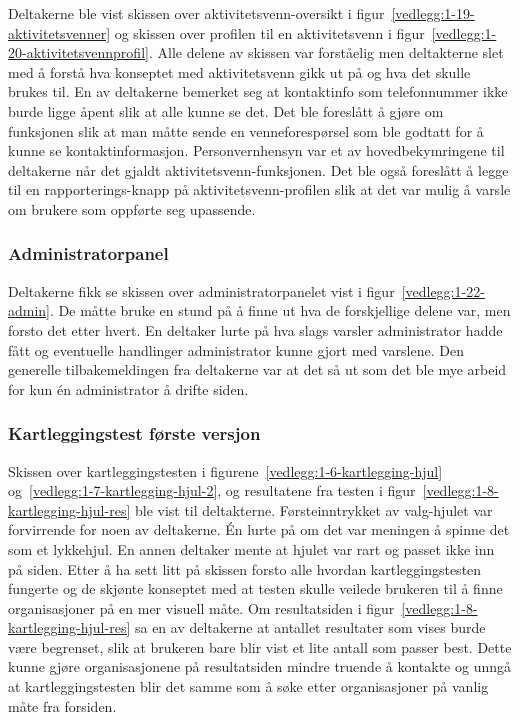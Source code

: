 Deltakerne ble vist skissen over aktivitetsvenn-oversikt i figur~\ref{vedlegg:1-19-aktivitetsvenner} og skissen over profilen til en aktivitetsvenn i figur~\ref{vedlegg:1-20-aktivitetsvennprofil}. Alle delene av skissen var forståelig men deltakterne slet med å forstå hva konseptet med aktivitetsvenn gikk ut på og hva det skulle brukes til. En av deltakerne bemerket seg at kontaktinfo som telefonnummer ikke burde ligge åpent slik at alle kunne se det. Det ble foreslått å gjøre om funksjonen slik at man måtte sende en venneforespørsel som ble godtatt for å kunne se kontaktinformasjon. Personvernhensyn var et av hovedbekymringene til deltakerne når det gjaldt aktivitetsvenn-funksjonen. Det ble også foreslått å legge til en rapporterings-knapp på aktivitetsvenn-profilen slik at det var mulig å varsle om brukere som oppførte seg upassende.

\subsubsection{Administratorpanel}

Deltakerne fikk se skissen over administratorpanelet vist i figur~\ref{vedlegg:1-22-admin}. De måtte bruke en stund på å finne ut hva de forskjellige delene var, men forsto det etter hvert. En deltaker lurte på hva slags varsler administrator hadde fått og eventuelle handlinger administrator kunne gjort med varslene. Den generelle tilbakemeldingen fra deltakerne var at det så ut som det ble mye arbeid for kun én administrator å drifte siden.


\subsubsection{Kartleggingstest første versjon}
\label{section:test-kartlegging-hjul1.0}

Skissen over kartleggingstesten i figurene~\ref{vedlegg:1-6-kartlegging-hjul} og~\ref{vedlegg:1-7-kartlegging-hjul-2}, og resultatene fra testen i figur~\ref{vedlegg:1-8-kartlegging-hjul-res} ble vist til deltakterne. Førsteinntrykket av valg-hjulet var forvirrende for noen av deltakerne. Én lurte på om det var meningen å spinne det som et lykkehjul. En annen deltaker mente at hjulet var rart og passet ikke inn på siden. Etter å ha sett litt på skissen forsto alle hvordan kartleggingstesten fungerte og de skjønte konseptet med at testen skulle veilede brukeren til å finne organisasjoner på en mer visuell måte. Om resultatsiden i figur~\ref{vedlegg:1-8-kartlegging-hjul-res} sa en av deltakerne at antallet resultater som vises burde være begrenset, slik at brukeren bare blir vist et lite antall som passer best. Dette kunne gjøre organisasjonene på resultatsiden mindre truende å kontakte og unngå at kartleggingstesten blir det samme som å søke etter organisasjoner på vanlig måte fra forsiden.


